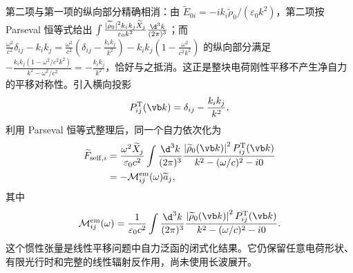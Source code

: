 第二项与第一项的纵向部分精确相消：由 $\widetilde E_{0i}=-ik_i\widetilde\rho_0/(\varepsilon_0k^2)$，第二项按 Parseval 恒等式给出 $\int\frac{|\widetilde\rho_0|^2k_ik_j\widetilde X_j}{\varepsilon_0k^2}\frac{\d^3k}{(2\pi)^3}$；而 $\frac{\omega^2}{c^2}\delta_{ij}-k_ik_j=\frac{\omega^2}{c^2}\left(\delta_{ij}-\frac{k_ik_j}{k^2}\right)-k_ik_j\left(1-\frac{\omega^2}{c^2k^2}\right)$ 的纵向部分满足 $-\frac{k_ik_j(1-\omega^2/c^2k^2)}{k^2-\omega^2/c^2}=-\frac{k_ik_j}{k^2}$，恰好与之抵消。这正是整块电荷刚性平移不产生净自力的平移对称性。引入横向投影
\begin{equation*}
 P_{ij}^{\mathrm T}(\vb k)=\delta_{ij}-{k_i k_j\over k^2},
\end{equation*}
利用 Parseval 恒等式整理后，同一个自力依次化为
\begin{align*}
 \widetilde F_{\mathrm{self},i}
 &= {\omega^2\widetilde X_j\over\varepsilon_0c^2}
 \int{\d^3k\over(2\pi)^3}
 {\left|\widetilde\rho_0(\vb k)\right|^2P_{ij}^{\mathrm T}(\vb k)
 \over k^2-(\omega/c)^2-i0}\\
 &=-\mathcal M_{ij}^{\mathrm{em}}(\omega)\widetilde a_j,
\end{align*}
其中
\begin{equation*}
 \mathcal M_{ij}^{\mathrm{em}}(\omega)
 ={1\over\varepsilon_0c^2}
 \int{\d^3k\over(2\pi)^3}
 {\left|\widetilde\rho_0(\vb k)\right|^2P_{ij}^{\mathrm T}(\vb k)
 \over k^2-(\omega/c)^2-i0}.
\end{equation*}
这个惯性张量是线性平移问题中自力泛函的闭式化结果。它仍保留任意电荷形状、有限光行时和完整的线性辐射反作用，尚未使用长波展开。

